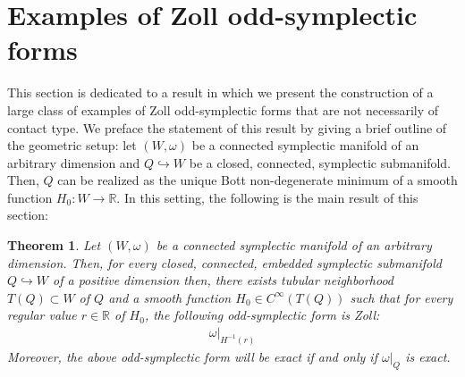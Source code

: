 \documentclass[11pt]{amsart}
\theoremstyle{plain}
\newtheorem{theorem}{Theorem}[section]
\theoremstyle{definition}
\theoremstyle{remark}
\begin{document}
\section{Examples of Zoll odd-symplectic forms}\label{Examples_section}
This section is dedicated to a result in which we present the construction of a large class of examples of Zoll odd-symplectic forms that are not necessarily of contact type. We preface the statement of this result by giving a brief outline of the geometric setup: let $(W,\omega)$ be a connected symplectic manifold of an arbitrary dimension and $Q \hookrightarrow W$ be a closed, connected, symplectic submanifold. Then, $Q$ can be realized as the unique Bott non-degenerate minimum of a smooth function $H_0:W \rightarrow \mathbb{R}$. In this setting, the following is the main result of this section:
\begin{theorem}\label{Examples_of_Zoll_odd-symplectic_forms}
    Let $(W,\omega)$ be a connected symplectic manifold of an arbitrary dimension. Then, for every closed, connected, embedded symplectic submanifold $Q \hookrightarrow W$ of a positive dimension then, there exists tubular neighborhood $T(Q) \subset W$ of $Q$ and a smooth function $H_0 \in C^{\infty}(T(Q))$ such that for every regular value $r \in \mathbb{R}$ of $H_0$, the following odd-symplectic form is Zoll:
    \begin{align}
        \omega\vert_{H^{-1}(r)}
    \end{align}
    Moreover, the above odd-symplectic form will be exact if and only if $\omega\vert_Q$ is exact.
\end{theorem}
\end{document}
